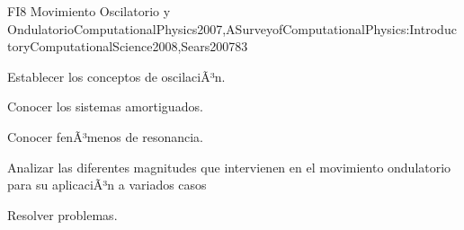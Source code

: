 \begin{syllabus}
\begin{unit}{FI8 Movimiento Oscilatorio y Ondulatorio}{ComputationalPhysics2007,ASurveyofComputationalPhysics:IntroductoryComputationalScience2008,Sears2007}{8}{3}
   \begin{learningoutcomes}
      \item Establecer los conceptos de oscilaciÃ³n.
      \item Conocer los sistemas amortiguados.
      \item Conocer fenÃ³menos de resonancia.
      \item Analizar las diferentes magnitudes que intervienen en el movimiento ondulatorio para su aplicaciÃ³n a variados casos
      \item Resolver problemas.
   \end{learningoutcomes}
\end{unit}



\begin{coursebibliography}
\end{coursebibliography}

\end{syllabus}

